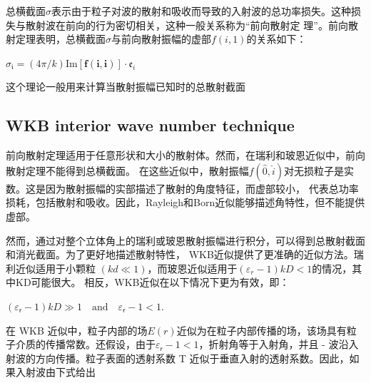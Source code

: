 \documentclass[12pt, a4paper, oneside]{ctexart}
\begin{document}
\begin{spacing}{2.0}
总横截面$\sigma$表示由于粒子对波的散射和吸收而导致的入射波的总功率损失。这种损失与散射波在前向的行为密切相关，这种一般关系称为“前向散射定
理”。前向散射定理表明，总横截面$\sigma$与前向散射振幅的虚部$f(i,1)$的关系如下：

\begin{center}
    $\sigma_\mathfrak{i}=(4\pi/k)\text{Im}[\mathbf{f}(\mathbf{i},\mathbf{i})]\cdot\mathfrak{e}_i$
\end{center}
这个理论一般用来计算当散射振幅已知时的总散射截面












\subsection{WKB interior wave number technique}
前向散射定理适用于任意形状和大小的散射体。然而，在瑞利和玻恩近似中，前向散射定理不能得到总横截面。
在这些近似中，散射振幅$f(\hat{0} , \hat{i})$对无损粒子是实数。这是因为散射振幅的实部描述了散射的角度特征，而虚部较小，
代表总功率损耗，包括散射和吸收。因此，Rayleigh和Born近似能够描述角特性，但不能提供虚部。

然而，通过对整个立体角上的瑞利或玻恩散射振幅进行积分，可以得到总散射截面和消光截面。为了更好地描述散射特性，
WKB近似提供了更准确的近似方法。瑞利近似适用于小颗粒 $(kd\ll 1)$，而玻恩近似适用于$(\varepsilon_r-1)kD < 1$的情况，其中KD可能很大。
相反，WKB近似在以下情况下更为有效，即：
\begin{center}
    $\displaystyle (\varepsilon_\mathsf{r}-1)kD\gg1\quad\text{and}\quad\varepsilon_\mathsf{r}-1<1.$
\end{center}
在 WKB 近似中，粒子内部的场$E(r)$近似为在粒子内部传播的场，该场具有粒子介质的传播常数。还假设，由于$\varepsilon_\mathsf{r}-1<1$，折射角等于入射角，并且 - 波沿入
射波的方向传播。粒子表面的透射系数 T 近似于垂直入射的透射系数。因此，如果入射波由下式给出


\end{spacing}
\end{document}
